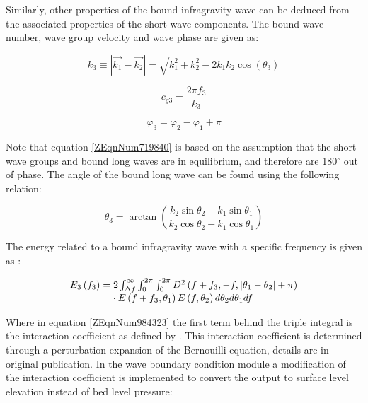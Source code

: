 Similarly, other properties of the bound infragravity wave can be deduced from the associated properties of the short wave components. The bound wave number, wave group velocity and wave phase are given as:

\begin{equation} \label{2.24)} 
k_{3} \equiv \left|\overrightarrow{k_{1} }-\overrightarrow{k_{2} }\right|=\sqrt{k_{1}^{2} +k_{2}^{2} -2k_{1} k_{2} \cos \left(\theta _{3} \right)}  
\end{equation} 

\begin{equation} \label{2.25)} 
c_{g3} =\frac{2\pi f_{3} }{k_{3} }  
\end{equation} 

\begin{equation} \label{ZEqnNum719840} 
\varphi _{3} =\varphi _{2} -\varphi _{1} +\pi  
\end{equation} 

Note that equation \eqref{ZEqnNum719840} is based on the assumption that the short wave groups and bound long waves are in equilibrium, and therefore are 180${}^\circ$ out of phase. The angle of the bound long wave can be found using the following relation:

\begin{equation} \label{2.27)} 
\theta _{3} =\arctan \left(\frac{k_{2} \sin \theta _{2} -k_{1} \sin \theta _{1} }{k_{2} \cos \theta _{2} -k_{1} \cos \theta _{1} } \right) 
\end{equation} 

The energy related to a bound infragravity wave with a specific frequency is given as \citep{VanDongeren2003}:

\begin{equation} \label{ZEqnNum984323} 
\begin{array}{l} {E_{3} \left(f_{3} \right)=2\int _{\Delta f}^{\infty }\int _{0}^{2\pi }\int _{0}^{2\pi }D^{2} \left(f+f_{3} ,-f,\left|\theta _{1} -\theta _{2} \right|+\pi \right)   } \\ {{\rm \; \; \; \; \; \; \; \; \; \; \; \; \; \; \; }\cdot E\left(f+f_{3} ,\theta _{1} \right)E\left(f,\theta _{2} \right)d\theta _{2} d\theta _{1} df} \end{array} 
\end{equation} 

Where in equation \eqref{ZEqnNum984323} the first term behind the triple integral is the interaction coefficient as defined by \citet{Herbers1994}. This interaction coefficient is determined through a perturbation expansion of the Bernouilli equation, details are in original publication. In the wave boundary condition module a modification of the interaction coefficient is implemented to convert the output to surface level elevation instead of bed level pressure:

